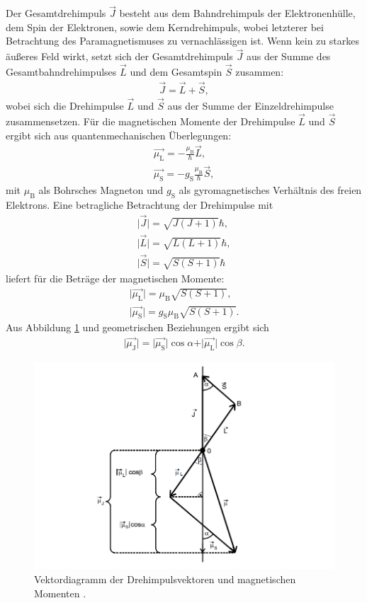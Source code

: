 \noindent Der Gesamtdrehimpuls $\vec{J}$ besteht aus dem Bahndrehimpuls der Elektronenhülle, dem
Spin der Elektronen, sowie dem Kerndrehimpuls, wobei letzterer bei Betrachtung des
Paramagnetismuses zu vernachlässigen ist. Wenn kein zu starkes äußeres Feld wirkt, setzt sich der
Gesamtdrehimpuls $\vec{J}$ aus der Summe des Gesamtbahndrehimpulses $\vec{L}$ und dem
Gesamtspin $\vec{S}$ zusammen:
\begin{align*}
\vec{J} = \vec{L} + \vec{S},
\end{align*}
wobei sich die Drehimpulse $\vec{L}$ und $\vec{S}$ aus der Summe der Einzeldrehimpulse
zusammensetzen. Für die magnetischen Momente der Drehimpulse $\vec{L}$ und $\vec{S}$ ergibt sich
aus quantenmechanischen Überlegungen:
\begin{align*}
\vec{\mu_\text{L}}=-\frac{\mu_\text{B}}{\hbar}\vec{L}, \\
\vec{\mu_\text{S}}=-g_\text{S}\frac{\mu_\text{B}}{\hbar}\vec{S},
\end{align*}
mit $\mu_\text{B}$ als Bohrsches Magneton und $g_\text{S}$ als gyromagnetisches Verhältnis des
freien Elektrons. Eine betragliche Betrachtung der Drehimpulse mit
\begin{align*}
\vert \vec{J}\vert= \sqrt{J(J+1)}\hbar, \\
\vert \vec{L}\vert= \sqrt{L(L+1)}\hbar, \\
\vert \vec{S}\vert= \sqrt{S(S+1)}\hbar
\end{align*}
liefert für die Beträge der magnetischen Momente:
\begin{align*}
\vert \vec{\mu_\text{L}}\vert = \mu_\text{B}\sqrt{S(S+1)}, \\
\vert \vec{\mu_\text{S}}\vert = g_\text{S}\mu_\text{B}\sqrt{S(S+1)}.
\end{align*}
Aus Abbildung \ref{fig:vektordiagramm} und geometrischen Beziehungen ergibt sich
\begin{align*}
\vert\vec{\mu_\text{J}}\vert = \vert\vec{\mu_\text{S}}\vert \cos\alpha + \vert\vec{\mu_\text{L}}\vert \cos\beta.
\end{align*}

\begin{figure}[H]
\centering
\includegraphics[scale=0.7]{vektor.png}
\caption{Vektordiagramm der Drehimpulsvektoren und magnetischen Momenten \cite{kent}.}
\label{fig:vektordiagramm}
\end{figure}


